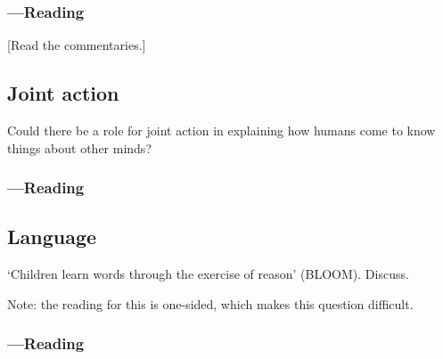 \documentclass[12pt,\papersize]{extarticle}
\begin{document}
\subsubsection{---Reading}



 [Read the commentaries.]




\subsection{Joint action}

Could there be a role for joint action in explaining how humans come to know things about other minds?

\subsubsection{---Reading}







\subsection{Language}
‘Children learn words through the exercise of reason’ (BLOOM).  Discuss.

Note: the reading for this is one-sided, which makes this question difficult.


\subsubsection{---Reading}






\subsection{}







%
\end{document}

